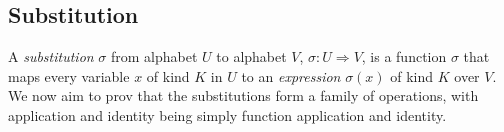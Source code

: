 
\subsection{Substitution}

A \emph{substitution} $\sigma$ from alphabet $U$ to alphabet $V$, $\sigma : U \Rightarrow V$, is a function $\sigma$ that maps every variable $x$ of kind $K$ in $U$ to an
\emph{expression} $\sigma(x)$ of kind $K$ over $V$.  We now aim to prov that the substitutions form a family of operations, with application and identity being simply function application and identity.


